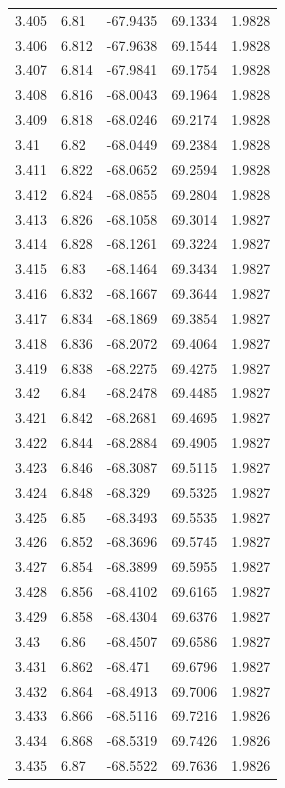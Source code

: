 \begin{tabular}{lllll}
3.405 & 6.81 & -67.9435 & 69.1334 & 1.9828 \\
3.406 & 6.812 & -67.9638 & 69.1544 & 1.9828 \\
3.407 & 6.814 & -67.9841 & 69.1754 & 1.9828 \\
3.408 & 6.816 & -68.0043 & 69.1964 & 1.9828 \\
3.409 & 6.818 & -68.0246 & 69.2174 & 1.9828 \\
3.41 & 6.82 & -68.0449 & 69.2384 & 1.9828 \\
3.411 & 6.822 & -68.0652 & 69.2594 & 1.9828 \\
3.412 & 6.824 & -68.0855 & 69.2804 & 1.9828 \\
3.413 & 6.826 & -68.1058 & 69.3014 & 1.9827 \\
3.414 & 6.828 & -68.1261 & 69.3224 & 1.9827 \\
3.415 & 6.83 & -68.1464 & 69.3434 & 1.9827 \\
3.416 & 6.832 & -68.1667 & 69.3644 & 1.9827 \\
3.417 & 6.834 & -68.1869 & 69.3854 & 1.9827 \\
3.418 & 6.836 & -68.2072 & 69.4064 & 1.9827 \\
3.419 & 6.838 & -68.2275 & 69.4275 & 1.9827 \\
3.42 & 6.84 & -68.2478 & 69.4485 & 1.9827 \\
3.421 & 6.842 & -68.2681 & 69.4695 & 1.9827 \\
3.422 & 6.844 & -68.2884 & 69.4905 & 1.9827 \\
3.423 & 6.846 & -68.3087 & 69.5115 & 1.9827 \\
3.424 & 6.848 & -68.329 & 69.5325 & 1.9827 \\
3.425 & 6.85 & -68.3493 & 69.5535 & 1.9827 \\
3.426 & 6.852 & -68.3696 & 69.5745 & 1.9827 \\
3.427 & 6.854 & -68.3899 & 69.5955 & 1.9827 \\
3.428 & 6.856 & -68.4102 & 69.6165 & 1.9827 \\
3.429 & 6.858 & -68.4304 & 69.6376 & 1.9827 \\
3.43 & 6.86 & -68.4507 & 69.6586 & 1.9827 \\
3.431 & 6.862 & -68.471 & 69.6796 & 1.9827 \\
3.432 & 6.864 & -68.4913 & 69.7006 & 1.9827 \\
3.433 & 6.866 & -68.5116 & 69.7216 & 1.9826 \\
3.434 & 6.868 & -68.5319 & 69.7426 & 1.9826 \\
3.435 & 6.87 & -68.5522 & 69.7636 & 1.9826 \\

\end{tabular}
